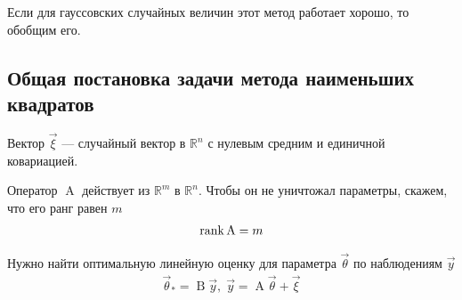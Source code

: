 Если для гауссовских случайных величин этот метод работает хорошо, то обобщим
его.

\subsection{Общая постановка задачи метода наименьших квадратов}

Вектор $\vec{\xi}$ --- случайный вектор в $\mathbb{R}^n$ с нулевым средним и
единичной ковариацией.

Оператор $\operatorname{A}$ действует из $\mathbb{R}^m$ в $\mathbb{R}^n$. Чтобы
он не уничтожал параметры, скажем, что его ранг равен $m$
\begin{align*}
  \operatorname{rank}{\operatorname{A}} = m
\end{align*}

Нужно найти оптимальную линейную оценку для параметра $\vec{\theta}$ по
наблюдениям $\vec{y}$
\begin{align*}
  \vec{\theta}_* = \operatorname{B} \vec{y},\;
      \vec{y} = \operatorname{A} \vec{\theta} + \vec{\xi}
\end{align*}

